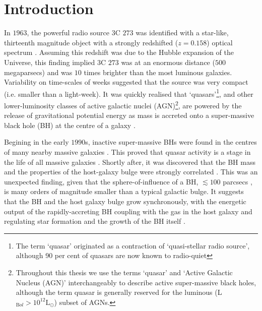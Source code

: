 
\chapter{Introduction}
\label{ch:intro}

In $1963$, the powerful radio source $3$C $273$ was identified with a star-like, thirteenth magnitude object with a strongly redshifted ($z=0.158$)  optical spectrum \citep{schmidt63}. 
Assuming this redshift was due to the Hubble expansion of the Universe, this finding implied $3$C $273$ was at an enormous distance ($500$ megaparsecs) and was $10$ times brighter than the most luminous galaxies. 
Variability on time-scales of weeks suggested that the source was very compact (i.e. smaller than a light-week).
It was quickly realised that `quasars'\footnote{The term `quasar' originated as a contraction of `quasi-stellar radio source', although 90 per cent of quasars are now known to radio-quiet}, and other lower-luminosity classes of active galactic nuclei (AGN)\footnote{Throughout this thesis we use the terms `quasar' and `Active Galactic Nucleus (AGN)' interchangeably to describe active super-massive black holes, although the term quasar is generally reserved for the luminous (L$_{\mathrm Bol} > 10^{12}{\mathrm L}_{\odot}$) subset of AGNs.}, are powered by the release of gravitational potential energy as mass is accreted onto a super-massive  black hole (BH) at the centre of a galaxy \citep[e.g.][]{hoyle63,salpeter64,lynden-bell69,lynden-bell71}. 

Begining in the early $1990$s, inactive super-massive BHs were found in the centres of many nearby massive galaxies \citep[e.g.][]{kormendy95,ferrarese05,kormendy13}.
This proved that quasar activity is a stage in the life of all massive galaxies \citep[e.g.][]{lynden-bell69}. 
Shortly after, it was discovered that the BH mass and the properties of the host-galaxy bulge were strongly correlated \citep[e.g. the M$_{\mathrm BH}$-$\sigma$ relation;][]{ferrarese00,gebhardt00,graham01,tremaine02,marconi03,aller07,gultekin09}. 
This was an unexpected finding, given that the sphere-of-influence  of a BH, $\lesssim100$ parcsecs \citep[e.g.][]{kormendy13}, is many orders of magnitude smaller than a typical galactic bulge. 
It suggests that the BH and the host galaxy bulge grow synchronously, with the energetic output of the rapidly-accreting BH coupling with the gas in the host galaxy and regulating star formation and the growth of the BH itself \citep[e.g.][]{silk98,king03,dimatteo05,king15}. 

